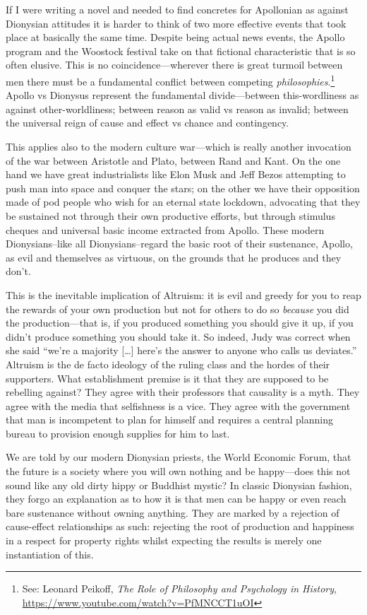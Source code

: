 \documentclass[11pt]{article}
\begin{document}
If I were writing a novel and needed to find concretes for Apollonian as against Dionysian attitudes it is harder to think of two more effective events that took place at basically the same time. Despite being actual news events, the Apollo program and the Woostock festival take on that fictional characteristic that is so often elusive. This is no coincidence---wherever there is great turmoil between men there must be a fundamental conflict between competing \emph{philosophies}.\footnote{See: Leonard Peikoff, \emph{The Role of Philosophy and Psychology in History}, \url{https://www.youtube.com/watch?v=PfMNCCT1uOI}} Apollo vs Dionysus represent the fundamental divide---between this-wordliness as against other-worldliness; between reason as valid vs reason as invalid; between the universal reign of cause and effect vs chance and contingency.

This applies also to the modern culture war---which is really another invocation of the war between Aristotle and Plato, between Rand and Kant. On the one hand we have great industrialists like Elon Musk and Jeff Bezos attempting to push man into space and conquer the stars; on the other we have their opposition made of pod people who wish for an eternal state lockdown, advocating that they be sustained not through their own productive efforts, but through stimulus cheques and universal basic income extracted from Apollo. These modern Dionysians--like all Dionysians--regard the basic root of their sustenance, Apollo, as evil and themselves as virtuous, on the grounds that he produces and they don't.

This is the inevitable implication of Altruism: it is evil and greedy for you to reap the rewards of your own production but not for others to do so \emph{because} you did the production---that is, if you produced something you should give it up, if you didn't produce something you should take it. So indeed, Judy was correct when she said ``we're a majority [\ldots{}] here's the answer to anyone who calls us deviates.'' Altruism is the de facto ideology of the ruling class and the hordes of their supporters. What establishment premise is it that they are supposed to be rebelling against? They agree with their professors that causality is a myth. They agree with the media that selfishness is a vice. They agree with the government that man is incompetent to plan for himself and requires a central planning bureau to provision enough supplies for him to last.

We are told by our modern Dionysian priests, the World Economic Forum, that the future is a society where you will own nothing and be happy---does this not sound like any old dirty hippy or Buddhist mystic? In classic Dionysian fashion, they forgo an explanation as to how it is that men can be happy or even reach bare sustenance without owning anything. They are marked by a rejection of cause-effect relationships as such: rejecting the root of production and happiness in a respect for property rights whilst expecting the results is merely one instantiation of this.
\end{document}
